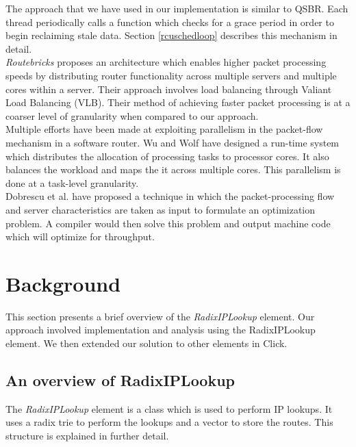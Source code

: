 \documentclass[12pt,a4paper]{article}
\begin{document}
The approach that we have used in our implementation is similar to QSBR. Each thread periodically calls a function which checks for a grace period in order to begin reclaiming stale data. Section \ref{rcuschedloop} describes this mechanism in detail.\\

\emph{Routebricks} \cite{routebricks} proposes an architecture which enables higher packet processing speeds by distributing router functionality across multiple servers and multiple cores within a server. Their approach involves load balancing through Valiant Load Balancing (VLB). Their method of achieving faster packet processing is at a coarser level of granularity when compared to our approach.\\

Multiple efforts have been made at exploiting parallelism in the packet-flow mechanism in a software router. Wu and Wolf \cite{runtimepacketprocessing} have designed a run-time system which distributes the allocation of processing tasks to processor cores. It also balances the workload and maps the it across multiple cores. This parallelism is done at a task-level granularity.\\ 

Dobrescu et al. \cite{dobrescu} have proposed a technique in which the packet-processing flow and server characteristics are taken as input to formulate an optimization problem. A compiler would then solve this problem and output machine code which will optimize for throughput.
\section{Background}
\label{sec:background}
This section presents a brief overview of the \emph{RadixIPLookup} element. Our approach involved implementation and analysis using the RadixIPLookup element. We then extended our solution to other elements in Click. 
\subsection{An overview of RadixIPLookup}
The \emph{RadixIPLookup} element \cite{radixiplookup} is a class which is used to perform IP lookups. It uses a radix trie to perform the lookups and a vector to store the routes. This structure is explained in further detail. 
\end{document}
